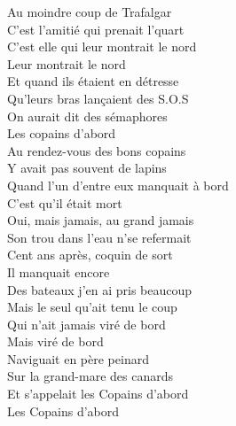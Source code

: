 \documentclass{novel}
\begin{document}
\begin{multicols}{2}
Au moindre coup de Trafalgar \\
C'est l'amitié qui prenait l'quart \\
C'est elle qui leur montrait le nord \\
Leur montrait le nord \\
Et quand ils étaient en détresse \\
Qu'leurs bras lançaient des S.O.S \\
On aurait dit des sémaphores \\
Les copains d'abord \\

Au rendez-vous des bons copains \\
Y avait pas souvent de lapins \\
Quand l'un d'entre eux manquait à bord \\
C'est qu'il était mort \\
Oui, mais jamais, au grand jamais \\
Son trou dans l'eau n'se refermait \\
Cent ans après, coquin de sort \\
Il manquait encore \\

Des bateaux j'en ai pris beaucoup \\
Mais le seul qu'ait tenu le coup \\
Qui n'ait jamais viré de bord \\
Mais viré de bord \\
Naviguait en père peinard \\
Sur la grand-mare des canards \\
Et s'appelait les Copains d'abord \\
Les Copains d'abord
\end{multicols}


\normalsize
\end{document}
